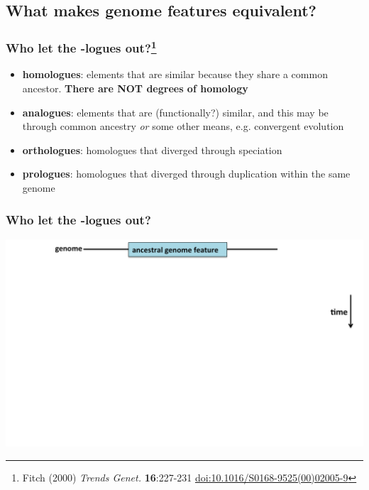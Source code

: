 
\subsection{What makes genome features equivalent?}

\begin{frame}
  \frametitle{Who let the -logues out?\footnote{\tiny{Fitch (2000) \textit{Trends Genet.} \textbf{16}:227-231 \href{http://dx.doi.org/10.1016/S0168-9525(00)02005-9}{doi:10.1016/S0168-9525(00)02005-9}}}}
    \begin{itemize}
      \item \textbf{homologues}: elements that are similar because they share a common ancestor. \textbf{There are NOT degrees of homology}
      \item \textbf{analogues}: elements that are (functionally?) similar, and this may be through common ancestry \textit{or} some other means, e.g. convergent evolution
      \item \textbf{orthologues}: homologues that diverged through speciation
      \item \textbf{prologues}: homologues that diverged through duplication within the same genome
    \end{itemize}
\end{frame}

\begin{frame}
  \frametitle{Who let the -logues out?}
  \begin{center}
    \includegraphics[width=1\textwidth]{images/logues1}  
  \end{center}  
\end{frame}


